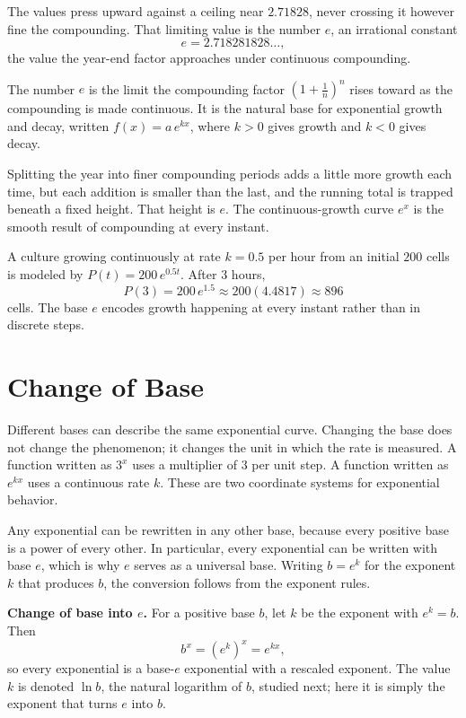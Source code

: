 \documentclass[12pt]{book}
\begin{document}
The values press upward against a ceiling near $2.71828$, never crossing it however
fine the compounding. That limiting value is the number $e$, an irrational constant
\[
e=2.718281828\ldots,
\]
the value the year-end factor approaches under continuous compounding.

\begin{keyidea}
The number $e$ is the limit the compounding factor $\left(1+\tfrac1n\right)^{n}$ rises
toward as the compounding is made continuous. It is the natural base for exponential
growth and decay, written $f(x)=a\,e^{kx}$, where $k>0$ gives growth and $k<0$ gives
decay.
\end{keyidea}

\begin{visual}
Splitting the year into finer compounding periods adds a little more growth each time,
but each addition is smaller than the last, and the running total is trapped beneath a
fixed height. That height is $e$. The continuous-growth curve $e^{x}$ is the smooth
result of compounding at every instant.
\end{visual}

\begin{example}
A culture growing continuously at rate $k=0.5$ per hour from an initial $200$ cells is
modeled by $P(t)=200\,e^{0.5t}$. After $3$ hours,
\[
P(3)=200\,e^{1.5}\approx 200(4.4817)\approx 896
\]
cells. The base $e$ encodes growth happening at every instant rather than in discrete
steps.
\end{example}

\section{Change of Base}

Different bases can describe the same exponential curve. Changing the base does not
change the phenomenon; it changes the unit in which the rate is measured. A function
written as $3^x$ uses a multiplier of $3$ per unit step. A function written as $e^{kx}$
uses a continuous rate $k$. These are two coordinate systems for exponential behavior.

Any exponential can be rewritten in any other base, because every positive base is a
power of every other. In particular, every exponential can be written with base $e$,
which is why $e$ serves as a universal base. Writing $b=e^{k}$ for the exponent $k$ that
produces $b$, the conversion follows from the exponent rules.

\begin{keyidea}
\textbf{Change of base into $e$.} For a positive base $b$, let $k$ be the exponent
with $e^{k}=b$. Then
\[
b^{x}=\left(e^{k}\right)^{x}=e^{kx},
\]
so every exponential is a base-$e$ exponential with a rescaled exponent. The value
$k$ is denoted $\ln b$, the natural logarithm of $b$, studied next; here it is simply
the exponent that turns $e$ into $b$.
\end{keyidea}
\end{document}

